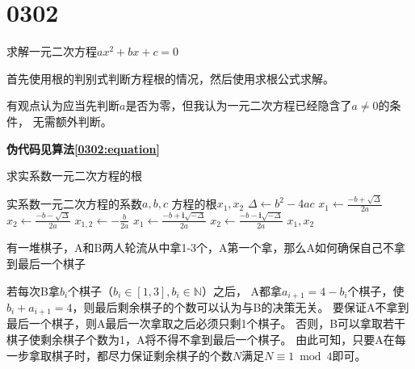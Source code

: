 \section{0302}

\begin{questions}

    \question 求解一元二次方程$ax^2+bx+c=0$

    \begin{solution}
        首先使用根的判别式判断方程根的情况，然后使用求根公式求解。

        {
        \color{red}
        有观点认为应当先判断$a$是否为零，但我认为一元二次方程已经隐含了$a \ne 0$的条件，
        无需额外判断。
        }

        \textbf{伪代码见算法\ref{0302:equation}}
    \end{solution}

    \begin{algorithm}[!htp]
        \caption{求实系数一元二次方程的根}\label{0302:equation}
        \begin{algorithmic}[1]
            \Require 实系数一元二次方程的系数$a,b,c$
            \Ensure 方程的根$x_1,x_2$
            \State $\Delta \gets b^2-4ac$ 
             
            \State $x_1 \gets \frac{-b + \sqrt{\Delta}}{2a}$
            \State $x_2 \gets \frac{-b - \sqrt{\Delta}}{2a}$
             
            \State $x_{1,2} \gets -\frac{b}{2a}$
             
            \State $x_1 \gets \frac{-b + \bm{i}\sqrt{-\Delta}}{2a}$
            \State $x_2 \gets \frac{-b - \bm{i}\sqrt{-\Delta}}{2a}$
            \EndIf
            \State \Return $x_1, x_2$
        \end{algorithmic}
    \end{algorithm}

    \question 有一堆棋子，A和B两人轮流从中拿1-3个，A第一个拿，那么A如何确保自己不拿到最后一个棋子

    \begin{solution}

        若每次B拿$b_i$个棋子（$b_i \in [1,3], b_i \in \mathbb{N}$）之后，
        A都拿$a_{i+1} = 4 - b_{i}$个棋子，使$b_i + a_{i+1} = 4$，则最后剩余棋子的个数可以认为与B的决策无关。
        要保证A不拿到最后一个棋子，则A最后一次拿取之后必须只剩1个棋子。
        否则，B可以拿取若干棋子使剩余棋子个数为1，A将不得不拿到最后一个棋子。
        由此可知，只要A在每一步拿取棋子时，都尽力保证剩余棋子的个数$N$满足$N \equiv 1 \bmod 4$即可。


\end{solution}
\end{questions}
